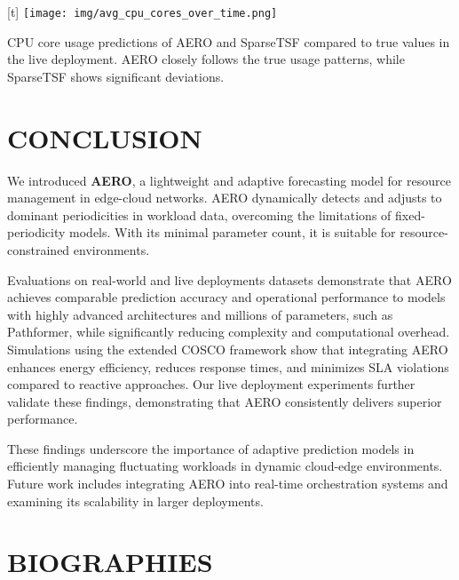 \documentclass{ieeetmlcn}
\begin{document}
\par\medskip\begin{center}[t]
    \centering
    \texttt{[image: img/avg\_cpu\_cores\_over\_time.png]}
    \caption{CPU core usage predictions of AERO and SparseTSF compared to true values in the live deployment. AERO closely follows the true usage patterns, while SparseTSF shows significant deviations.}
    \label{fig:cpu_predictions}\end{center}\medskip\par

\section{CONCLUSION}
\label{sec:conclusion}

We introduced \textbf{AERO}, a lightweight and adaptive forecasting model for resource management in edge-cloud networks. AERO dynamically detects and adjusts to dominant periodicities in workload data, overcoming the limitations of fixed-periodicity models. With its minimal parameter count, it is suitable for resource-constrained environments.

Evaluations on real-world and live deployments datasets demonstrate that AERO achieves comparable prediction accuracy and operational performance to models with highly advanced architectures and millions of parameters, such as Pathformer, while significantly reducing complexity and computational overhead. Simulations using the extended COSCO framework show that integrating AERO enhances energy efficiency, reduces response times, and minimizes SLA violations compared to reactive approaches. {\color{blue} Our live deployment experiments further validate these findings, demonstrating that AERO consistently delivers superior performance}.

These findings underscore the importance of adaptive prediction models in efficiently managing fluctuating workloads in dynamic cloud-edge environments. Future work includes integrating AERO into real-time orchestration systems and examining its scalability in larger deployments.

\section*{BIOGRAPHIES}
\end{document}
